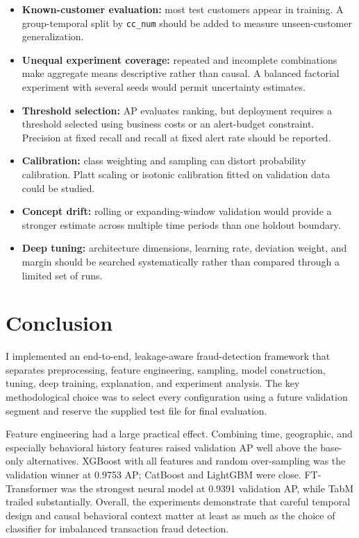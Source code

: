 \documentclass[11pt,a4paper]{article}
\newcommand{\code}[1]{\texttt{#1}}
\begin{document}
\begin{itemize}
    \item \textbf{Known-customer evaluation:} most test customers appear in training. A group-temporal split by \code{cc\_num} should be added to measure unseen-customer generalization.
    \item \textbf{Unequal experiment coverage:} repeated and incomplete combinations make aggregate means descriptive rather than causal. A balanced factorial experiment with several seeds would permit uncertainty estimates.
    \item \textbf{Threshold selection:} AP evaluates ranking, but deployment requires a threshold selected using business costs or an alert-budget constraint. Precision at fixed recall and recall at fixed alert rate should be reported.
    \item \textbf{Calibration:} class weighting and sampling can distort probability calibration. Platt scaling or isotonic calibration fitted on validation data could be studied.
    \item \textbf{Concept drift:} rolling or expanding-window validation would provide a stronger estimate across multiple time periods than one holdout boundary.
    \item \textbf{Deep tuning:} architecture dimensions, learning rate, deviation weight, and margin should be searched systematically rather than compared through a limited set of runs.
\end{itemize}

\section{Conclusion}

I implemented an end-to-end, leakage-aware fraud-detection framework that separates preprocessing, feature engineering, sampling, model construction, tuning, deep training, explanation, and experiment analysis. The key methodological choice was to select every configuration using a future validation segment and reserve the supplied test file for final evaluation.

Feature engineering had a large practical effect. Combining time, geographic, and especially behavioral history features raised validation AP well above the base-only alternatives. XGBoost with all features and random over-sampling was the validation winner at 0.9753 AP; CatBoost and LightGBM were close. FT-Transformer was the strongest neural model at 0.9391 validation AP, while TabM trailed substantially. Overall, the experiments demonstrate that careful temporal design and causal behavioral context matter at least as much as the choice of classifier for imbalanced transaction fraud detection.
\end{document}
